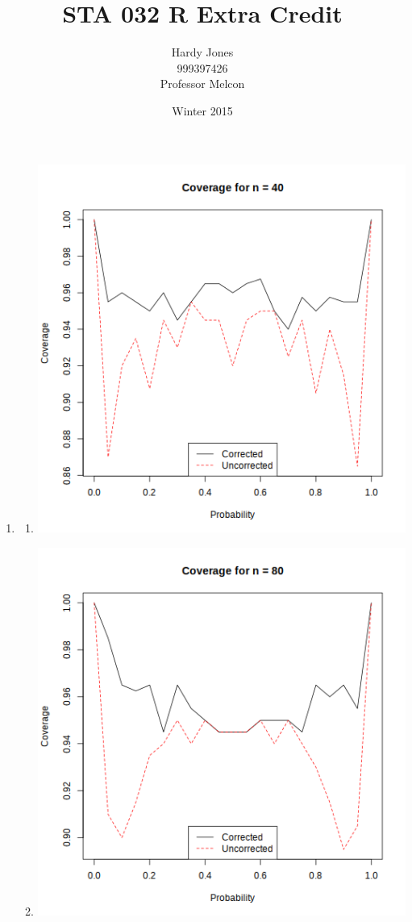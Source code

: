 \documentclass[12pt,letterpaper]{article}
\title{STA 032 R Extra Credit\vspace{-2ex}}
\author{Hardy Jones\\
        999397426\\
        Professor Melcon\vspace{-2ex}}
\date{Winter 2015}
\begin{document}
  \maketitle


  \begin{enumerate}
    \item
      \begin{enumerate}
        \item
          \includegraphics[width=\linewidth]{prob1a.png}
        \item
          \includegraphics[width=\linewidth]{prob1b.png}

\end{enumerate}
\end{enumerate}
\end{document}

